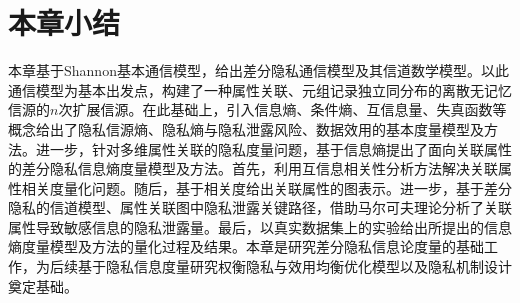 \section{本章小结}
本章基于Shannon基本通信模型，给出差分隐私通信模型及其信道数学模型。以此通信模型为基本出发点，构建了一种属性关联、元组记录独立同分布的离散无记忆信源的$n$次扩展信源。在此基础上，引入信息熵、条件熵、互信息量、失真函数等概念给出了隐私信源熵、隐私熵与隐私泄露风险、数据效用的基本度量模型及方法。进一步，针对多维属性关联的隐私度量问题，基于信息熵提出了面向关联属性的差分隐私信息熵度量模型及方法。首先，利用互信息相关性分析方法解决关联属性相关度量化问题。随后，基于相关度给出关联属性的图表示。进一步，基于差分隐私的信道模型、属性关联图中隐私泄露关键路径，借助马尔可夫理论分析了关联属性导致敏感信息的隐私泄露量。最后，以真实数据集上的实验给出所提出的信息熵度量模型及方法的量化过程及结果。本章是研究差分隐私信息论度量的基础工作，为后续基于隐私信息度量研究权衡隐私与效用均衡优化模型以及隐私机制设计奠定基础。

